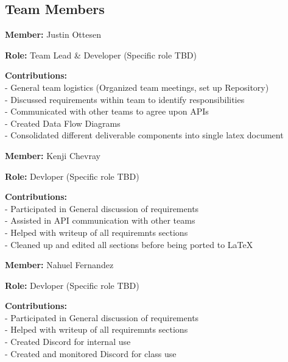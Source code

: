 \subsection*{Team Members}

\textbf{Member:} Justin Ottesen

\smallskip

\textbf{Role:} Team Lead \& Developer (Specific role TBD)

\smallskip

\textbf{Contributions:} \\
- General team logistics (Organized team meetings, set up Repository) \\
- Discussed requirements within team to identify responsibilities \\
- Communicated with other teams to agree upon APIs \\
- Created Data Flow Diagrams \\
- Consolidated different deliverable components into single latex document

\bigskip

\textbf{Member:} Kenji Chevray

\smallskip

\textbf{Role:} Devloper (Specific role TBD)

\smallskip

\textbf{Contributions:} \\
- Participated in General discussion of requirements \\
- Assisted in API communication with other teams \\
- Helped with writeup of all requiremnts sections \\
- Cleaned up and edited all sections before being ported to LaTeX

\bigskip

\textbf{Member:} Nahuel Fernandez

\smallskip

\textbf{Role:} Devloper (Specific role TBD)

\smallskip

\textbf{Contributions:} \\
- Participated in General discussion of requirements \\
- Helped with writeup of all requiremnts sections \\
- Created Discord for internal use \\
- Created and monitored Discord for class use

\bigskip

